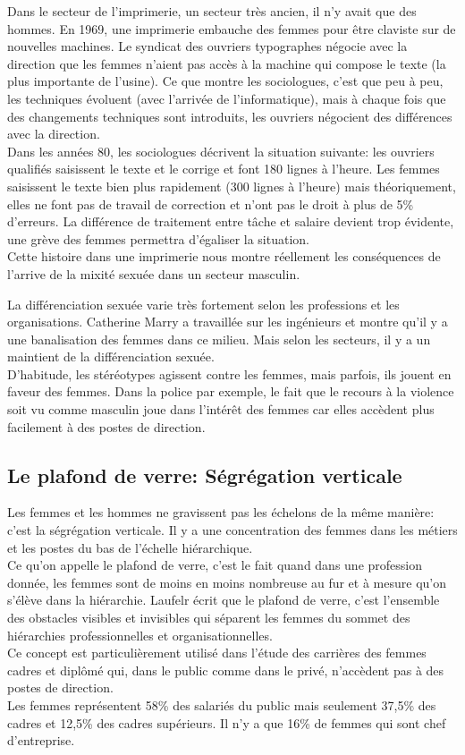 \documentclass[12pt, a4paper, openany]{book}
\begin{document}
Dans le secteur de l'imprimerie, un secteur très ancien, il n'y avait que des hommes. En 1969, une imprimerie embauche des femmes pour être claviste sur de nouvelles machines. Le syndicat des ouvriers typographes négocie avec la direction que les femmes n'aient pas accès à la machine qui compose le texte (la plus importante de l'usine). Ce que montre les sociologues, c'est que peu à peu, les techniques évoluent (avec l'arrivée de l'informatique), mais à chaque fois que des changements techniques sont introduits, les ouvriers négocient des différences avec la direction. \\
Dans les années 80, les sociologues décrivent la situation suivante: les ouvriers qualifiés saisissent le texte et le corrige et font 180 lignes à l'heure. Les femmes saisissent le texte bien plus rapidement (300 lignes à l'heure) mais théoriquement, elles ne font pas de travail de correction et n'ont pas le droit à plus de 5\% d'erreurs. La différence de traitement entre tâche et salaire devient trop évidente, une grève des femmes permettra d'égaliser la situation. \\
Cette histoire dans une imprimerie nous montre réellement les conséquences de l'arrive de la mixité sexuée dans un secteur masculin.


La différenciation sexuée varie très fortement selon les professions et les organisations. Catherine Marry a travaillée sur les ingénieurs et montre qu'il y a une banalisation des femmes dans ce milieu. Mais selon les secteurs, il y a un maintient de la différenciation sexuée. \\
D'habitude, les stéréotypes agissent contre les femmes, mais parfois, ils jouent en faveur des femmes. Dans la police par exemple, le fait que le recours à la violence soit vu comme masculin joue dans l'intérêt des femmes car elles accèdent plus facilement à des postes de direction. 


\subsection{Le plafond de verre: Ségrégation verticale}

Les femmes et les hommes ne gravissent pas les échelons de la même manière: c'est la ségrégation verticale. Il y a une concentration des femmes dans les métiers et les postes du bas de l'échelle hiérarchique. \\
Ce qu'on appelle le plafond de verre, c'est le fait quand dans une profession donnée, les femmes sont de moins en moins nombreuse au fur et à mesure qu'on s'élève dans la hiérarchie. Laufelr écrit que le plafond de verre, c'est l'ensemble des obstacles visibles et invisibles qui séparent les femmes du sommet des hiérarchies professionnelles et organisationnelles. \\
Ce concept est particulièrement utilisé dans l'étude des carrières des femmes cadres et diplômé qui, dans le public comme dans le privé, n'accèdent pas à des postes de direction. \\
Les femmes représentent 58\% des salariés du public mais seulement 37,5\% des cadres et 12,5\% des cadres supérieurs. Il n'y a que 16\% de femmes qui sont chef d'entreprise. 
\end{document}
